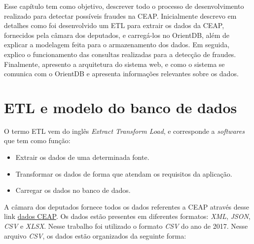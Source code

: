 	Esse capítulo tem como objetivo, descrever todo o processo de desenvolvimento realizado para detectar possíveis fraudes na CEAP. Inicialmente descrevo em detalhes como foi desenvolvido um ETL para extrair os dados da CEAP, fornecidos pela câmara dos deputados, e carregá-los no OrientDB, além de explicar a modelagem feita para o armazenamento dos dados. Em seguida, explico o funcionamento das consultas realizadas para a detecção de fraudes. Finalmente, apresento a arquitetura do sistema web, e como o sistema se comunica com o OrientDB e apresenta informações relevantes sobre os dados.

\section{ETL e modelo do banco de dados}

	O termo ETL vem do inglês \textit{Extract Transform Load}, e corresponde a \textit{softwares} que tem como função:
\begin{itemize}
		\item Extrair os dados de uma determinada fonte.
		\item Transformar os dados de forma que atendam os requisitos da aplicação.
		\item Carregar os dados no banco de dados.
\end{itemize}
	
	A câmara dos deputados fornece todos os dados referentes a CEAP através desse link \href{http://www2.camara.leg.br/transparencia/cota-para-exercicio-da-atividade-parlamentar/dados-abertos-cota-parlamentar}{dados CEAP}. Os dados estão presentes em diferentes formatos: \textit{XML}, \textit{JSON}, \textit{CSV} e \textit{XLSX}. Nesse trabalho foi utilizado o formato \textit{CSV} do ano de 2017. Nesse arquivo \textit{CSV}, os dados estão organizados da seguinte forma:

